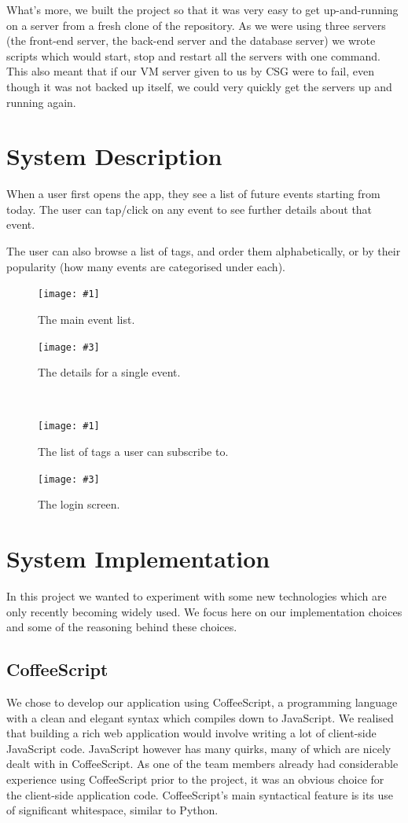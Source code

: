 \documentclass[11pt]{article}
\newcommand{\twofigure}[4]{
\begin{minipage}{0.45\textwidth}
    \centering
    \texttt{[image: \#1]}
    \caption{#2}
\end{minipage}
\begin{minipage}{0.45\textwidth}
    \centering
    \texttt{[image: \#3]}
    \caption{#4}
\end{minipage}
}
\begin{document}
What's more, we built the project so that it was very easy to get up-and-running on a server from a fresh clone of the repository. As we were using three servers (the front-end server, the back-end server and the database server) we wrote scripts which would start, stop and restart all the servers with one command. This also meant that if our VM server given to us by CSG were to fail, even though it was not backed up itself, we could very quickly get the servers up and running again.

\section {System Description}

When a user first opens the app, they see a list of future events starting from today. The user can tap/click on any event to see further details about that event.

The user can also browse a list of tags, and order them alphabetically, or by their popularity (how many events are categorised under each).


\begin{figure}
\twofigure{images/event-list.png}{The main event list.}{images/event-detail.png}{The details for a single event.}
\\[2em]
\twofigure{images/tag-list.png}{The list of tags a user can subscribe to.}{images/login.png}{The login screen.}
\end{figure}

\section {System Implementation}

In this project we wanted to experiment with some new technologies which are only recently becoming widely used. We focus here on our implementation choices and some of the reasoning behind these choices.

\subsection{CoffeeScript}
We chose to develop our application using CoffeeScript, a programming language with a clean and elegant syntax which compiles down to JavaScript. We realised that building a rich web application would involve writing a lot of client-side JavaScript code. JavaScript however has many quirks, many of which are nicely dealt with in CoffeeScript. As one of the team members already had considerable experience using CoffeeScript prior to the project, it was an obvious choice for the client-side application code. CoffeeScript's main syntactical feature is its use of significant whitespace, similar to Python.
\end{document}
